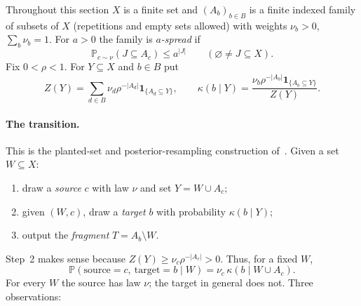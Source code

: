 \documentclass[11pt]{article}
\numberwithin{equation}{section}
\newcommand{\PP}{\mathbb P}
\newcommand{\ind}{\mathbf 1}
\begin{document}
Throughout this section $X$ is a finite set and $(A_b)_{b\in B}$ is a
finite indexed family of subsets of $X$ (repetitions and empty sets
allowed) with weights $\nu_b>0$, $\sum_b\nu_b=1$. For $a>0$ the family is
\emph{$a$-spread} if
\begin{equation}\label{eq:spread}
 \PP_{c\sim\nu}(J\subseteq A_c)\le a^{|J|}
 \qquad(\varnothing\ne J\subseteq X).
\end{equation}
Fix $0<\rho<1$. For $Y\subseteq X$ and $b\in B$ put
\begin{equation}\label{eq:posterior}
 Z(Y)=\sum_{d\in B}\nu_d\rho^{-|A_d|}\ind_{\{A_d\subseteq Y\}},
 \qquad
 \kappa(b\mid Y)=\frac{\nu_b\rho^{-|A_b|}\ind_{\{A_b\subseteq Y\}}}{Z(Y)}.
\end{equation}

\paragraph{The transition.}
This is the planted-set and posterior-resampling construction
of~\cite[Sections~2.1--2.3]{MNSZ25}. Given a set $W\subseteq X$:
\begin{enumerate}[label=\arabic*.,itemsep=1pt,topsep=3pt]
 \item draw a \emph{source} $c$ with law $\nu$ and set $Y=W\cup A_c$;
 \item given $(W,c)$, draw a \emph{target} $b$ with probability
 $\kappa(b\mid Y)$;
 \item output the \emph{fragment} $T=A_b\setminus W$.
\end{enumerate}
Step~2 makes sense because $Z(Y)\ge\nu_c\rho^{-|A_c|}>0$. Thus, for a
fixed $W$,
\begin{equation}\label{eq:joint}
 \PP(\mathrm{source}=c,\ \mathrm{target}=b\mid W)
 =\nu_c\,\kappa(b\mid W\cup A_c).
\end{equation}
For every $W$ the source has law $\nu$; the target in general does not.
Three observations:
\end{document}
